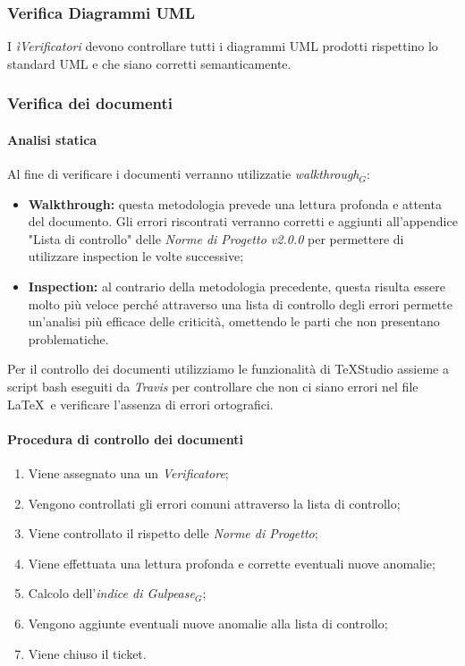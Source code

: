 \subsubsection{Verifica Diagrammi UML}
I \textit{ìVerificatori} devono controllare tutti i diagrammi UML prodotti rispettino lo standard UML e che siano corretti semanticamente.
\subsubsection{Verifica dei documenti}
\paragraph{Analisi statica}
Al fine di verificare i documenti verranno utilizzatie \textit{walkthrough$_{G}$}:
\begin{itemize}
	\item \textbf{Walkthrough:} questa metodologia prevede una lettura profonda e attenta del documento. Gli errori riscontrati verranno corretti e aggiunti all'appendice "Lista di controllo" delle \textit{Norme di Progetto v2.0.0} per permettere di utilizzare inspection le volte successive;
	\item \textbf{Inspection:} al contrario della metodologia precedente, questa risulta essere molto più veloce perché attraverso una lista di controllo degli errori permette un'analisi più efficace delle criticità, omettendo le parti che non presentano problematiche. 
\end{itemize}
Per il controllo dei documenti utilizziamo le funzionalità di TeXStudio assieme a script bash eseguiti da \textit{Travis} per controllare che non ci siano errori nel file \LaTeX\  e verificare l'assenza di errori ortografici. 
\paragraph{Procedura di controllo dei documenti}
\begin{enumerate}
	\item Viene assegnato una un \textit{Verificatore};
	\item Vengono controllati gli errori comuni attraverso la lista di controllo;
	\item Viene controllato il rispetto delle \textit{Norme di Progetto};
	\item Viene effettuata una lettura profonda e corrette eventuali nuove anomalie;
	\item Calcolo dell'\textit{indice di Gulpease$_{G}$};
	\item Vengono aggiunte eventuali nuove anomalie alla lista di controllo;
	\item Viene chiuso il ticket.
\end{enumerate}
